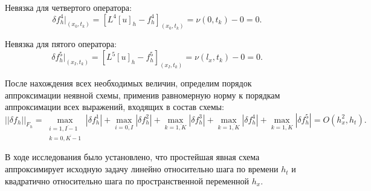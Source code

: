 {{		Невязка для четвертого оператора:
		\begin{equation}
			\delta f^4_h|_{ (x_0, t_k ) } = [L^4[u]_h - f^4_h]_{ (x_0, t_k ) } = \nu(0 , t_k) - 0 = 0\nonumber.
		\end{equation}
		
		Невязка для пятого оператора:
		\begin{equation}
		\delta f^5_h|_{ (x_I, t_k ) } = [L^5[u]_h - f^5_h]_{ (x_I, t_k ) } = \nu(l_x , t_k) - 0 = 0\nonumber.
		\end{equation}
		
		После нахождения всех необходимых величин, определим порядок аппроксимации неявной схемы, применив равномерную норму к порядкам аппроксимации всех выражений, входящих в состав схемы:
		\begin{equation}
			|| \delta f_h ||_{F_h} = \max_{\substack{i = \overline{1, I-1} \\ k = \overline{0, K-1}}} | \delta f^1_h| + \max_{i = \overline{0, I}} | \delta f^2_h| + \max_{k = \overline{1, K}} | \delta f^3_h| +  \max_{k = \overline{1, K}} | \delta f^4_h| +  \max_{k = \overline{1, K}} | \delta f^5_h| = O(h^2_x, h_t).
		\end{equation}
		
		В ходе исследования было установлено, что простейшая явная схема аппроксимирует исходную задачу линейно относительно шага по времени $h_t$ и квадратично относительно шага по пространственной переменной $h_x$. 
		
}}
